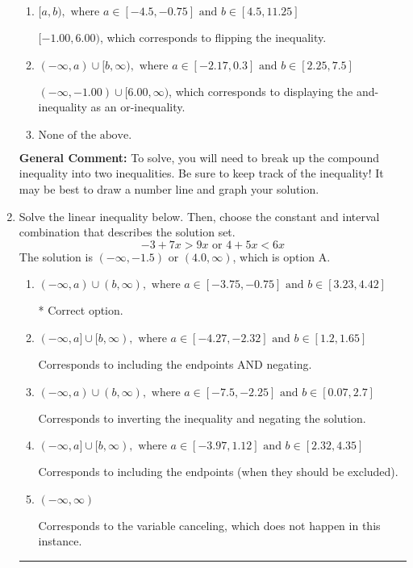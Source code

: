 \documentclass{extbook}[14pt]
\newcommand{\litem}[1]{\item #1

\rule{\textwidth}{0.4pt}}
\begin{document}
\begin{enumerate}
{\begin{enumerate}[label=\Alph*.]
* $(-1.00, 6.00]$, which is the correct option.
\item \( [a, b), \text{ where } a \in [-4.5, -0.75] \text{ and } b \in [4.5, 11.25] \)

$[-1.00, 6.00)$, which corresponds to flipping the inequality.
\item \( (-\infty, a) \cup [b, \infty), \text{ where } a \in [-2.17, 0.3] \text{ and } b \in [2.25, 7.5] \)

$(-\infty, -1.00) \cup [6.00, \infty)$, which corresponds to displaying the and-inequality as an or-inequality.
\item \( \text{None of the above.} \)


\end{enumerate}

\textbf{General Comment:} To solve, you will need to break up the compound inequality into two inequalities. Be sure to keep track of the inequality! It may be best to draw a number line and graph your solution.
}
\litem{
Solve the linear inequality below. Then, choose the constant and interval combination that describes the solution set.
\[ -3 + 7 x > 9 x \text{ or } 4 + 5 x < 6 x \]The solution is \( (-\infty, -1.5) \text{ or } (4.0, \infty) \), which is option A.\begin{enumerate}[label=\Alph*.]
\item \( (-\infty, a) \cup (b, \infty), \text{ where } a \in [-3.75, -0.75] \text{ and } b \in [3.23, 4.42] \)

 * Correct option.
\item \( (-\infty, a] \cup [b, \infty), \text{ where } a \in [-4.27, -2.32] \text{ and } b \in [1.2, 1.65] \)

Corresponds to including the endpoints AND negating.
\item \( (-\infty, a) \cup (b, \infty), \text{ where } a \in [-7.5, -2.25] \text{ and } b \in [0.07, 2.7] \)

Corresponds to inverting the inequality and negating the solution.
\item \( (-\infty, a] \cup [b, \infty), \text{ where } a \in [-3.97, 1.12] \text{ and } b \in [2.32, 4.35] \)

Corresponds to including the endpoints (when they should be excluded).
\item \( (-\infty, \infty) \)

Corresponds to the variable canceling, which does not happen in this instance.
\end{enumerate}

}
\end{enumerate}
\end{document}
